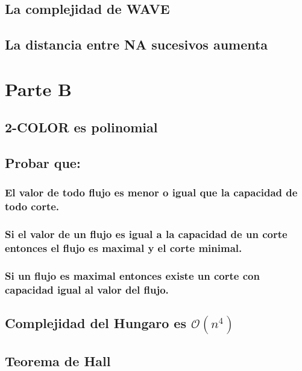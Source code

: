 \documentclass[12pt,a4paper]{report}
\begin{document}
		
		
		
		
		
		
	\section{La complejidad de WAVE}

	
	\section{La distancia entre NA sucesivos aumenta}
	


\chapter{Parte B}

	\section{2-COLOR es polinomial}
	
	
	\section{Probar que:}
	
		\subsection{El valor de todo flujo es menor o igual que la capacidad de todo corte.}
		
		\subsection{Si el valor de un flujo es igual a la capacidad de un corte entonces el flujo es maximal y el corte minimal.}
		
		\subsection{Si un flujo es maximal entonces existe un corte con capacidad igual al valor del flujo.}
	
	
	\section{Complejidad del Hungaro es $\mathcal{O}(n^{4})$}
	
	
	\section{Teorema de Hall}
	
\end{document}
